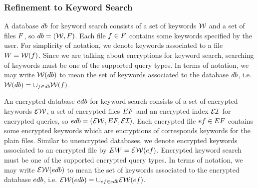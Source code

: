 \subsubsection{Refinement to Keyword Search}
A database $db$ for keyword search consists of a set of keywords $\mathcal{W}$ and a set of files $F$, so $db = (\mathcal{W}, F)$. Each file $f \in F$ contains some keywords specified by the user. For simplicity of notation, we denote keywords associated to a file $W = \mathcal{W}(f)$. Since we are talking about encryptions for keyword search, searching of keywords must be one of the supported query types. In terms of notation, we may write $\mathcal{W}(db)$ to mean the set of keywords associated to the database $db$, i.e. $\mathcal{W}(db) = \cup_{f \in db} \mathcal{W}(f)$.

An encrypted database $edb$ for keyword search consists of a set of encrypted keywords $\mathcal{EW}$, a set of encrypted files $EF$ and an encrypted index $\mathcal{EI}$ for encrypted queries, so $edb = (\mathcal{EW}, EF, \mathcal{EI})$. Each encrypted file $ef \in EF$ contains some encrypted keywords which are encryptions of corresponds keywords for the plain files. Similar to unencrypted databases, we denote encrypted keywords associated to an encrypted file by $EW = \mathcal{EW}(ef)$. Encrypted keyword search must be one of the supported encrypted query types. In terms of notation, we may write $\mathcal{EW}(edb)$ to mean the set of keywords associated to the encrypted database $edb$, i.e. $\mathcal{EW}(edb) = \cup_{ef \in edb} \mathcal{EW}(ef)$.


